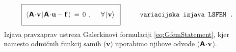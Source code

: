 \begin{equation}
	\boxed{\
      \bra{\mkern1mu \mathbsf{A} \! \cdot \! \mathbf{v} \mkern1mu}
      \ket{\mkern2mu \mathbsf{A} \! \cdot \! \mathbf{u} - \mathbf{f} \mkern2mu} \, = \,
		0 \ , \hspace{5mm} \forall \ket{\mathbf{v}} \vphantom{\bigg{)}} \
	}
	\hspace{10mm} \texttt{variacijska izjava LSFEM .}
	\label{eq:LsfemVariationalStatement}
\end{equation}
Izjava pravzaprav ustreza Galerkinovi formulaciji \eqref{eq:GfemStatement}, kjer namesto odmičnih funkcij samih ($\mathbf{v}$) uporabimo njihove odvode ($\bm{\mathsf{A}} \! \cdot \! \mathbf{v}$).